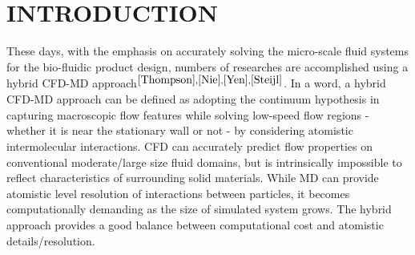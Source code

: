 \documentclass{CFD2010paper}
\begin{document}


\section{INTRODUCTION}
These days, with the emphasis on accurately solving the micro-scale fluid systems for the bio-fluidic product design, numbers of researches are accomplished using a hybrid CFD-MD approach$^{\cite{Thompson},\cite{Nie},\cite{Yen},\cite{Steijl}}$. In a word, a hybrid CFD-MD approach can be defined as adopting the continuum hypothesis in capturing macroscopic flow features while solving low-speed flow regions - whether it is near the stationary wall or not - by considering atomistic intermolecular interactions. CFD can accurately predict flow properties on conventional moderate/large size fluid domains, but is intrinsically impossible to reflect characteristics of surrounding solid materials. While MD can provide atomistic level resolution of interactions between particles, it becomes computationally demanding as the size of simulated system grows. The hybrid approach provides a good balance between computational cost and atomistic details/resolution.

\end{document}
